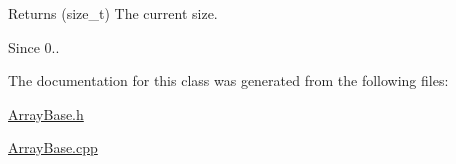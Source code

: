 \begin{DoxyReturn}{Returns}
(size\+\_\+t) The current size. 
\end{DoxyReturn}
\begin{DoxySince}{Since}
0.. 
\end{DoxySince}


The documentation for this class was generated from the following files\+:\begin{DoxyCompactItemize}
\item 
\hyperlink{ArrayBase_8h}{Array\+Base.\+h}\item 
\hyperlink{ArrayBase_8cpp}{Array\+Base.\+cpp}\end{DoxyCompactItemize}
